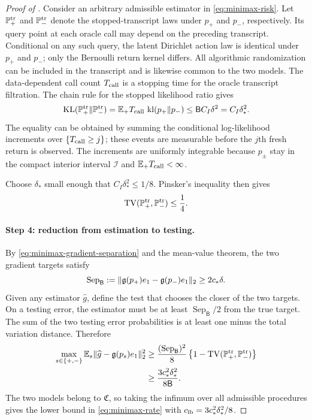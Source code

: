 \begin{proof}[Proof of ]
Consider an arbitrary admissible estimator in \eqref{eq:minimax-risk}.  Let $\mathbb P_+^{\rm tr}$ and $\mathbb P_-^{\rm tr}$ denote the stopped-transcript laws under $p_+$ and $p_-$, respectively.  Its query point at each oracle call may depend on the preceding transcript.  Conditional on any such query, the latent Dirichlet action law is identical under $p_+$ and $p_-$; only the Bernoulli return kernel differs.  All algorithmic randomization can be included in the transcript and is likewise common to the two models.  The data-dependent call count $T_{\rm call}$ is a stopping time for the oracle transcript filtration.  The chain rule for the stopped likelihood ratio gives
\begin{equation}\label{eq:stopped-transcript-kl}
 \operatorname{KL}(\mathbb P_+^{\rm tr}\Vert\mathbb P_-^{\rm tr})
 =\mathbb E_+T_{\rm call}\,\operatorname{kl}(p_+\Vert p_-)
 \le \mathsf B C_I\delta^2=C_I\delta_*^2.
\end{equation}
The equality can be obtained by summing the conditional log-likelihood increments over
$\{T_{\rm call}\ge j\}$; these events are measurable before the $j$th fresh return is observed.  The increments are uniformly integrable because $p_\pm$ stay in the compact interior interval $\mathcal I$ and $\mathbb E_+T_{\rm call}<\infty$.

Choose $\delta_*$ small enough that $C_I\delta_*^2\le1/8$.  Pinsker's inequality then gives
\begin{equation}\label{eq:minimax-tv}
 \operatorname{TV}(\mathbb P_+^{\rm tr},\mathbb P_-^{\rm tr})\le\frac14.
\end{equation}

\paragraph{Step 4: reduction from estimation to testing.}
By \eqref{eq:minimax-gradient-separation} and the mean-value theorem, the two gradient targets satisfy
\begin{equation}\label{eq:minimax-target-distance}
 \operatorname{Sep}_{\mathsf B}
 :=\lVert\mathfrak g(p_+)e_1-\mathfrak g(p_-)e_1\rVert_2
 \ge2c_*\delta.
\end{equation}
Given any estimator $\widehat g$, define the test that chooses the closer of the two targets.  On a testing error, the estimator must be at least $\operatorname{Sep}_{\mathsf B}/2$ from the true target.  The sum of the two testing error probabilities is at least one minus the total variation distance.  Therefore
\begin{align*}
 \max_{s\in\{+,-\}}
 \mathbb E_s\lVert\widehat g-\mathfrak g(p_s)e_1\rVert_2^2
 &\ge \frac{(\operatorname{Sep}_{\mathsf B})^2}{8}
 \left\{1-\operatorname{TV}(\mathbb P_+^{\rm tr},\mathbb P_-^{\rm tr})\right\}\\
 &\ge \frac{3c_*^2\delta_*^2}{8\mathsf B}.
\end{align*}
The two models belong to $\mathfrak C$, so taking the infimum over all admissible procedures gives the lower bound in \eqref{eq:minimax-rate} with
$c_{\rm lb}=3c_*^2\delta_*^2/8$.


\end{proof}
